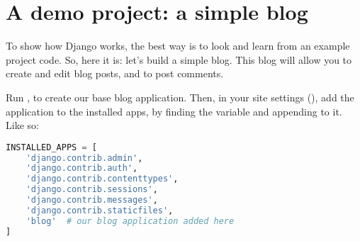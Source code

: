 \section{A demo project: a simple blog}
    To show how Django works, the best way is to look and learn from an example project code.
    So, here it is: let's build a simple blog. This blog will allow you to create and edit blog posts,
    and to post comments.
    
    Run , to create our base blog application.
    Then, in your site settings (), add the 
    application to the installed apps, 
    by finding the  variable 
    and appending  to it. Like so:
    
    \begin{lstlisting}[language=python, numbers=none, title=\texttt{mysite/settings.py}]
INSTALLED_APPS = [
    'django.contrib.admin',
    'django.contrib.auth',
    'django.contrib.contenttypes',
    'django.contrib.sessions',
    'django.contrib.messages',
    'django.contrib.staticfiles',
    'blog'  # our blog application added here
]
    \end{lstlisting}
    
    
    
    
    
    
    
    
    
    
